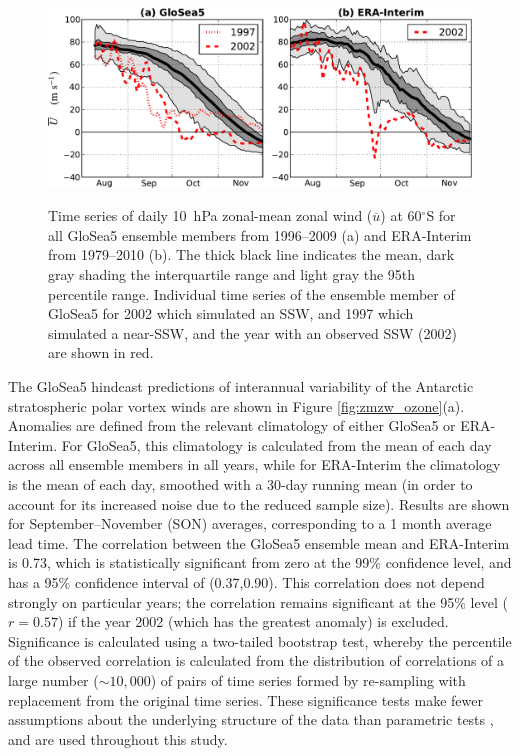 \begin{figure}[t]
  \noindent\includegraphics[width=\textwidth,angle=0]{figures/chapter-seasonal/zmzw_climatologies_crop.pdf}\\
  \caption[Comparison of GloSea5 and ERA-Interim zonal-mean zonal wind
  climatologies.]{Time series of daily 10~hPa zonal-mean zonal wind
    ($\overline{u}$) at 60$^{\circ}$S for all GloSea5 ensemble members from
    1996--2009 (a) and ERA-Interim from 1979--2010 (b). The thick black line
    indicates the mean, dark gray shading the interquartile range and light gray
    the 95th percentile range. Individual time series of the ensemble member of
    GloSea5 for 2002 which simulated an SSW, and 1997 which simulated a
    near-SSW, and the year with an observed SSW (2002) are shown in
    red.}\label{fig:sh_zmzw_clim}
\end{figure}

The GloSea5 hindcast predictions of interannual variability of the Antarctic
stratospheric polar vortex winds are shown in Figure
\ref{fig:zmzw_ozone}(a). Anomalies are defined from the relevant climatology of
either GloSea5 or ERA-Interim. For GloSea5, this climatology is calculated from
the mean of each day across all ensemble members in all years, while for
ERA-Interim the climatology is the mean of each day, smoothed with a 30-day
running mean (in order to account for its increased noise due to the reduced
sample size). Results are shown for September--November (SON) averages,
corresponding to a 1 month average lead time. The correlation between the
GloSea5 ensemble mean and ERA-Interim is 0.73, which is statistically
significant from zero at the 99\% confidence level, and has a 95\% confidence
interval of (0.37,0.90). This correlation does not depend strongly on particular
years; the correlation remains significant at the 95\% level ($r=0.57$) if the
year 2002 (which has the greatest anomaly) is excluded. Significance is
calculated using a two-tailed bootstrap test, whereby the percentile of the
observed correlation is calculated from the distribution of correlations of a
large number ($\sim 10,000$) of pairs of time series formed by re-sampling with
replacement from the original time series. These significance tests make fewer
assumptions about the underlying structure of the data than parametric tests
\citep{Wilks}, and are used throughout this study.

